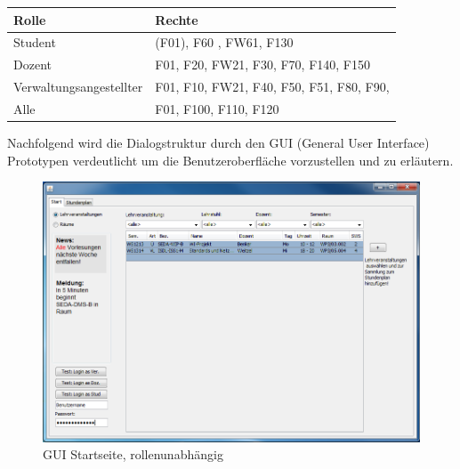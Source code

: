 \begin{table}[h]
\begin{tabular}{l|l}
Rolle&Rechte\\
\hline
\hline
Student & (F01), F60 , FW61, F130 \\
\hline
Dozent & F01, F20, FW21, F30, F70, F140, F150  \\
\hline
Verwaltungsangestellter & F01, F10, FW21, F40, F50, F51, F80, F90,  \\
\hline
Alle & F01, F100, F110, F120
\end{tabular}
\end{table}

Nachfolgend wird die Dialogstruktur durch den GUI (General User Interface) Prototypen verdeutlicht um die Benutzeroberfläche vorzustellen und zu erläutern.\\
\begin{figure}
\begin{center}
\includegraphics{images/section_7/HauptseiteAlle.PNG}
\caption{GUI Startseite, rollenunabhängig}
\label{img:hauptseite}
\end{center}
\end{figure}